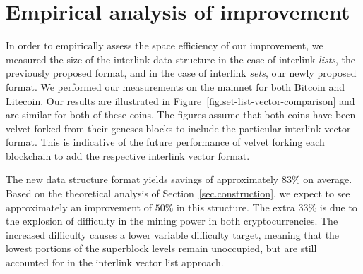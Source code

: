 \section{Empirical analysis of improvement}

In order to empirically assess the space efficiency of our improvement, we
measured the size of the interlink data structure in the case of interlink
\emph{lists}, the previously proposed format, and in the case of interlink
\emph{sets}, our newly proposed format. We performed our measurements on the
mainnet for both Bitcoin and Litecoin. Our results are illustrated in
Figure~\ref{fig.set-list-vector-comparison} and are similar for both of these
coins. The figures assume that both coins have been velvet forked from their
geneses blocks to include the particular interlink vector format. This is
indicative of the future performance of velvet forking each blockchain to add
the respective interlink vector format.

The new data structure format yields savings of approximately $83\%$ on average.
Based on the theoretical analysis of Section~\ref{sec.construction}, we expect
to see approximately an improvement of $50\%$ in this structure. The extra
$33\%$ is due to the explosion of difficulty in the mining power in both
cryptocurrencies. The increased difficulty causes a lower variable difficulty
target, meaning that the lowest portions of the superblock levels remain
unoccupied, but are still accounted for in the interlink vector list approach.

